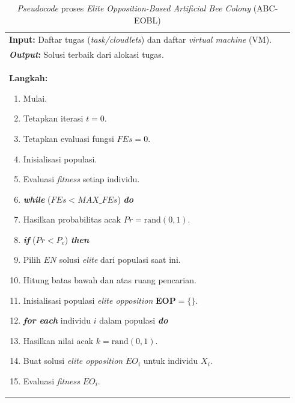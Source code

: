 \begin{table}[H]
    \centering
    \caption{\textit{Pseudocode} proses \textit{Elite Opposition-Based Artificial Bee Colony} (ABC-EOBL)}
    \begin{tabular}{|p{0.95\linewidth}|}
    \hline
    \textbf{Input:} Daftar tugas (\textit{task/cloudlets}) dan daftar \textit{virtual machine} (VM). \\
    \textbf{\textit{Output}:} Solusi terbaik dari alokasi tugas. \\
    \textbf{Langkah:}
    \begin{enumerate}[leftmargin=*, label=\arabic*., itemsep=0pt, parsep=0pt]
        \item Mulai.
        \item Tetapkan iterasi $t = 0$.
        \item Tetapkan evaluasi fungsi $FEs = 0$.
        \item Inisialisasi populasi.
        \item Evaluasi \textit{fitness} setiap individu.
        \item \textbf{\textit{while}} ($FEs < MAX\_FEs$) \textbf{\textit{do}}
        \item \hspace{1em} Hasilkan probabilitas acak $Pr = \text{rand}(0, 1)$.
        \item \hspace{1em} \textbf{\textit{if}} ($Pr < P_e$) \textbf{\textit{then}}
        \item \hspace{2em} Pilih $EN$ solusi \textit{elite} dari populasi saat ini.
        \item \hspace{2em} Hitung batas bawah dan atas ruang pencarian.
        \item \hspace{2em} Inisialisasi populasi \textit{elite opposition} $\mathbf{EOP} = \{\}$.
        \item \hspace{2em} \textbf{\textit{for each}} individu $i$ dalam populasi \textbf{\textit{do}}
        \item \hspace{3em} Hasilkan nilai acak $k = \text{rand}(0, 1)$.
        \item \hspace{3em} Buat solusi \textit{elite opposition} $EO_i$ untuk individu $X_i$.
        \item \hspace{3em} Evaluasi \textit{fitness} $EO_i$.

\end{enumerate}
\end{tabular}
\end{table}
